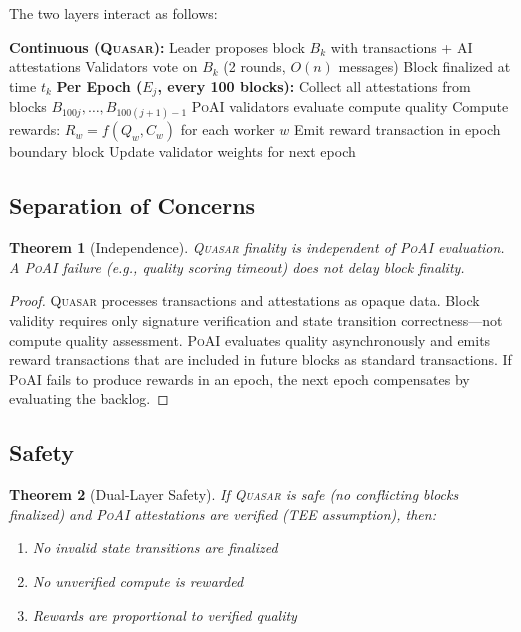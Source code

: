 \documentclass[11pt,letterpaper]{article}
\newtheorem{theorem}{Theorem}[section]
\newcommand{\PoAI}{\textsc{PoAI}}
\newcommand{\Quasar}{\textsc{Quasar}}
\begin{document}
The two layers interact as follows:

\begin{algorithm}[t]
\caption{Dual-Layer Block Production}
\label{alg:dual}
\begin{algorithmic}[1]
\STATE \textbf{Continuous (\Quasar{}):}
\STATE Leader proposes block $B_k$ with transactions + AI attestations
\STATE Validators vote on $B_k$ (2 rounds, $O(n)$ messages)
\STATE Block finalized at time $t_k$
\STATE \textbf{Per Epoch ($E_j$, every 100 blocks):}
\STATE Collect all attestations from blocks $B_{100j}, \ldots, B_{100(j+1)-1}$
\STATE \PoAI{} validators evaluate compute quality
\STATE Compute rewards: $R_w = f(Q_w, C_w)$ for each worker $w$
\STATE Emit reward transaction in epoch boundary block
\STATE Update validator weights for next epoch
\end{algorithmic}
\end{algorithm}

\subsection{Separation of Concerns}

\begin{theorem}[Independence]
\Quasar{} finality is independent of \PoAI{} evaluation. A \PoAI{} failure (e.g., quality scoring timeout) does not delay block finality.
\end{theorem}

\begin{proof}
\Quasar{} processes transactions and attestations as opaque data. Block validity requires only signature verification and state transition correctness---not compute quality assessment. \PoAI{} evaluates quality asynchronously and emits reward transactions that are included in future blocks as standard transactions. If \PoAI{} fails to produce rewards in an epoch, the next epoch compensates by evaluating the backlog.
\end{proof}

\subsection{Safety}

\begin{theorem}[Dual-Layer Safety]
If \Quasar{} is safe (no conflicting blocks finalized) and \PoAI{} attestations are verified (TEE assumption), then:
\begin{enumerate}
    \item No invalid state transitions are finalized
    \item No unverified compute is rewarded
    \item Rewards are proportional to verified quality
\end{enumerate}
\end{theorem}
\end{document}
